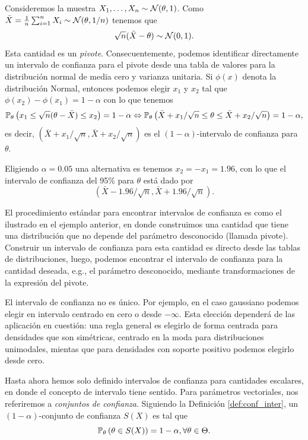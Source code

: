 \begin{example}
	Consideremos la muestra $X_1,\ldots,X_n\sim{\mathcal N}(\theta,1)$. Como $\bar{X}=\frac{1}{n}\sum_{i=1}^nX_i\sim{\mathcal N}(\theta,1/n)$ tenemos que  
	\begin{equation}
			\sqrt{n}(\bar{X}-\theta)\sim{\mathcal N}(0,1).
		\end{equation}	
	Esta cantidad es un \emph{pivote}. Consecuentemente, podemos identificar directamente un intervalo de confianza para el pivote desde una tabla de valores para la distribución normal de media cero y varianza unitaria. Si $\phi(x)$ denota la distribución Normal, entonces podemos elegir  $x_1$ y $x_2$ tal que $\phi(x_2)-\phi(x_1) = 1-\alpha$ con lo que tenemos
	\begin{equation}
	 	\mathbb{P}_\theta \left(x_1 \leq \sqrt{n}(\theta-\bar{X}) \leq x_2\right) = 1-\alpha \Leftrightarrow \mathbb{P}_\theta \left(\bar{X} + x_1/\sqrt{n} \leq \theta \leq \bar{X} + x_2/\sqrt{n}\right) = 1-\alpha,
	 \end{equation} 
	 es decir, $(\bar{X} + x_1/\sqrt{n},\bar{X} + x_2/\sqrt{n})$ es el $(1-\alpha)$-intervalo de confianza para $\theta$. 
	 
	 Eligiendo $\alpha=0.05$ una alternativa es tenemos $x_2 = -x_1 =1.96$, con lo que el intervalo de confianza del 95\% para $\theta$ está dado por 
	 \begin{equation}
	 	(\bar{X} -1.96/\sqrt{n},\bar{X} + 1.96/\sqrt{n}).
	 \end{equation}

	 El procedimiento estándar para encontrar intervalos de confianza es como el ilustrado en el ejemplo anterior, en donde construimos una cantidad que tiene una distribución que no depende del parámetro desconocido (llamada pivote). Construir un intervalo de confianza para esta cantidad es directo desde las tablas de distribuciones, luego, podemos encontrar el intervalo de confianza para la cantidad deseada, e.g., el parámetro desconocido, mediante transformaciones de la expresión del pivote. 

	 \begin{remark}
	 	El intervalo de confianza no es único. Por ejemplo, en el caso gaussiano podemos elegir en intervalo centrado en cero o desde $-\infty$. Esta elección dependerá de las aplicación en cuestión: una regla general es elegirlo de forma centrada para densidades que son simétricas, centrado en la moda para distribuciones unimodales, mientas que para densidades con soporte positivo podemos elegirlo desde cero. 
	 \end{remark}

	 Hasta ahora hemos solo definido intervalos de confianza para cantidades escalares, en donde el concepto de intervalo tiene sentido. Para parámetros vectoriales, nos referiremos a  \textit{conjuntos de confianza}. Siguiendo la Definición \ref{def:conf_inter}, un $(1-\alpha)$-conjunto de confianza $S(X)$ es tal que 
	 \begin{equation}
	\label{eq:conf_set}
	\mathbb{P}_\theta \left(\theta\in S(X)\right) = 1-\alpha, \forall \theta\in\Theta.
\end{equation}
\end{example}



